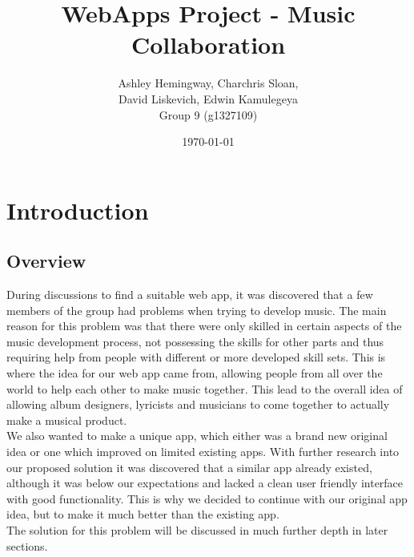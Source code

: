 \documentclass{article}
\title{WebApps Project - Music Collaboration}
\author{Ashley Hemingway, Charchris Sloan, \\ David Liskevich, Edwin Kamulegeya \\ Group 9 (g1327109)}
\date{\today}
\begin{document}
\maketitle

\section{Introduction}
\subsection{Overview}
During discussions to find a suitable web app, it was discovered that a few members of the group had problems when trying to develop music. The main reason for this problem was that there were only skilled in certain aspects of the music development process, not possessing the skills for other parts and thus requiring help from people with different or more developed skill sets. This is where the idea for our web app came from, allowing people from all over the world to help each other to make music together. This lead to the overall idea of allowing album designers, lyricists and musicians to come together to actually make a musical product.\\
We also wanted to make a unique app, which either was a brand new original idea or one which improved on limited existing apps. With further research into our proposed solution it was discovered that a similar app already existed, although it was below our expectations and lacked a clean user friendly interface with good functionality. This is why we decided to continue with our original app idea, but to make it much better than the existing app.\\
The solution for this problem will be discussed in much further depth in later sections.
\end{document}

